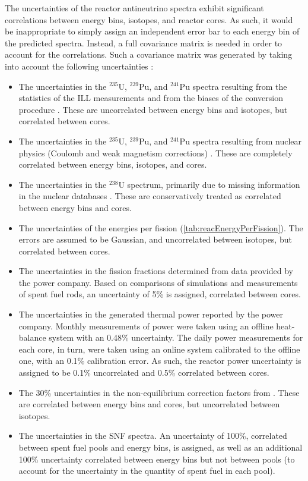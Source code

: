 \documentclass[../thesis.tex]{subfiles}
\begin{document}
The uncertainties of the reactor antineutrino spectra exhibit significant correlations between energy bins, isotopes, and reactor cores. As such, it would be inappropriate to simply assign an independent error bar to each energy bin of the predicted spectra. Instead, a full covariance matrix is needed in order to account for the correlations. Such a covariance matrix was generated by taking into account the following uncertainties \cite{Lewis}:

\begin{itemize}
\item The uncertainties in the $^{235}$U, $^{239}$Pu, and $^{241}$Pu spectra resulting from the statistics of the ILL measurements and from the biases of the conversion procedure \cite{PhysRevC.84.024617}. These are uncorrelated between energy bins and isotopes, but correlated between cores.
\item The uncertainties in the $^{235}$U, $^{239}$Pu, and $^{241}$Pu spectra resulting from nuclear physics (Coulomb and weak magnetism corrections) \cite{PhysRevC.84.024617}. These are completely correlated between energy bins, isotopes, and cores.
\item The uncertainties in the $^{238}$U spectrum, primarily due to missing information in the nuclear databases \cite{PhysRevC.83.054615}. These are conservatively treated as correlated between energy bins and cores.
\item The uncertainties of the energies per fission (\autoref{tab:reacEnergyPerFission}). The errors are assumed to be Gaussian, and uncorrelated between isotopes, but correlated between cores.
\item The uncertainties in the fission fractions determined from data provided by the power company. Based on comparisons of simulations and measurements of spent fuel rods, an uncertainty of 5\% is assigned, correlated between cores.
\item The uncertainties in the generated thermal power reported by the power company. Monthly measurements of power were taken using an offline heat-balance system with an 0.48\% uncertainty. The daily power measurements for each core, in turn, were taken using an online system calibrated to the offline one, with an 0.1\% calibration error. As such, the reactor power uncertainty is assigned to be 0.1\% uncorrelated and 0.5\% correlated between cores.
\item The 30\% uncertainties in the non-equilibrium correction factors from \cite{PhysRevC.83.054615}. These are correlated between energy bins and cores, but uncorrelated between isotopes.
\item The uncertainties in the SNF spectra. An uncertainty of 100\%, correlated between spent fuel pools and energy bins, is assigned, as well as an additional 100\% uncertainty correlated between energy bins but not between pools (to account for the uncertainty in the quantity of spent fuel in each pool).
\end{itemize}
\end{document}
